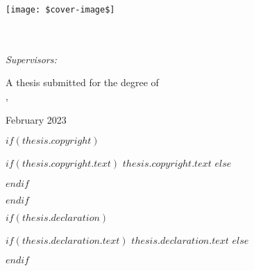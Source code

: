 \frontmatter %

\pagestyle{plain} %


\begin{titlepage}
\thispagestyle{empty}%
\null\vskip1cm%
\texttt{[image: \$cover-image\$]}
\vfill
\singlespacing
\begin{flushleft}\fontsize{24}{28}\sf
    \textbf{\expandafter{\ttitle}}\\[0.5cm]
    \fontsize{18}{20}\sf
    \authorname\\
    \vfill
    \fontsize{13}{15}\sf
    \emph{Supervisors:} \supname

    A thesis submitted for the degree of \degreename\\
    \deptname, \groupname

    February 2023
\end{flushleft}
\end{titlepage}

$if(thesis.copyright)$
\begin{copyright}
\addchaptertocentry{\copyrightname} %
$if(thesis.copyright.text)$
$thesis.copyright.text$
$else$

$endif$

\end{copyright}

\cleardoublepage
$endif$

$if(thesis.declaration)$
\begin{declaration}
\addchaptertocentry{\authorshipname} %
$if(thesis.declaration.text)$
$thesis.declaration.text$
$else$

$endif$

\end{declaration}

